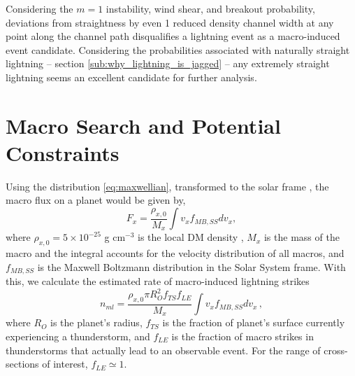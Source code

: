 \documentclass[%
 reprint,
 amsmath,amssymb,
 aps,
]{revtex4-2}
\newcommand{\vtwo}[1]{{\color{black} #1}}
\begin{document}
        \vtwo{Considering the $m=1$ instability, wind shear, and breakout probability, deviations from straightness by even 1 reduced density channel width at any point along the channel path disqualifies a lightning event as a macro-induced event candidate. Considering the probabilities associated with naturally straight lightning -- section \ref{sub:why_lightning_is_jagged} -- any extremely straight lightning seems an excellent candidate for further analysis.}




\section{Macro Search and Potential Constraints}  %
\label{sec:macro_search_and_constraints}

    Using the distribution \eqref{eq:maxwellian}, transformed to the solar frame \vtwo{\citep{Freese2013}}, the macro flux on a planet would be given by,
    \begin{equation}\label{eq:planet_macro_flux}
        F_{x} = \frac{\rho_{x,0}}{M_{x}} \int v_{x} f_{MB,SS} dv_x,
    \end{equation}
    where $\rho_{x,0} = 5 \times 10^{-25}$ g cm$^{-3}$ is the local DM density \vtwo{\citep{Bovy2012}}, $M_{x}$ is the mass of the macro and the integral accounts for the velocity distribution of all macros, and $f_{MB,SS}$ is the Maxwell Boltzmann distribution in the Solar System frame. With this, we calculate the estimated rate of macro-induced lightning strikes
    \begin{equation}\label{eq:macro_lightning_rate}
        n_{ml} = \frac{\rho_{x,0} \pi R_{O}^2 f_{TS} f_{LE}}{M_{x}}\int v_{x} f_{MB,SS} dv_x\,,
    \end{equation}
    where $R_{O}$ is the planet's radius, $f_{TS}$ is the fraction of planet's surface currently experiencing a thunderstorm, and $f_{LE}$ is the fraction of macro strikes in thunderstorms that actually lead to an observable event. For the range of cross-sections of interest, $f_{LE}\simeq1$.
\end{document}
